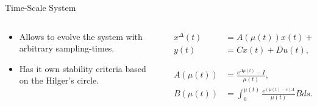 \begin{slide}{Time-Scale System}
  \begin{columns}[c]
    \begin{column}{0.48\textwidth}
      \begin{itemize}
        \item Allows to evolve the system with arbitrary sampling-times.
        \item Has it own stability criteria based on the Hilger's circle.
      \end{itemize}
    \end{column}%
    \hfill%
    \begin{column}{0.48\textwidth}
      \begin{align}
        x^{\Delta}(t) & = A(\mu(t))x(t) + B(\mu(t))u(t),                      \\
        y(t)          & = Cx(t) + Du(t),                                      \\
        \phantom{1}   & \phantom{1}                                 \nonumber \\
        A(\mu(t))     & = \frac{e^{A\mu(t)}-I}{\mu(t)},                       \\
        B(\mu(t))     & = \int_{0}^{\mu(t)}\frac{e^{(\mu(t)-s)A}}{\mu(t)}Bds.
      \end{align}
    \end{column}%
  \end{columns}
\end{slide}

